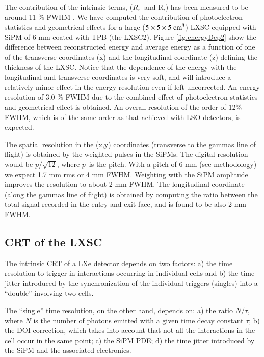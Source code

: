 \documentclass[review]{elsarticle}
\begin{document}
The contribution of the intrinsic terms, ($R_r$~and R$_i$) has been measured to be
around 11 \% FWHM \cite{aprileRes}. We have computed the contribution of photoelectron statistics and geometrical effects for a large
($5 \times 5 \times 5 {\rm ~cm^3}$) LXSC equipped with SiPM of 6 mm coated with TPB (the LXSC2).  
Figure \ref{fig.energyDep2} show the difference between reconstructed energy and average energy as a function of one of the transverse coordinates (x) and the longitudinal coordinate (z) defining the thickness of the LXSC. Notice that the dependence of the energy with the longitudinal and transverse coordinates is very soft, and will introduce a relatively minor effect in the energy resolution even if left uncorrected. An energy resolution of 3.0 \% FWHM due to the combined effect of photoelectron statistics and geometrical effect is obtained. 
An overall resolution of the order of 12\% FWHM, which is of the same order as that achieved with LSO detectors, is expected. 

The spatial resolution in the (x,y) coordinates (transverse to the gammas line of flight) is obtained by the weighted pulses in the SiPMs. The digital resolution would be
$p/\sqrt{12}$, where $p$~is the pitch. With a pitch of 6 mm (see methodology) we expect 1.7 mm rms or 4 mm FWHM. Weighting with the SiPM amplitude improves the resolution to about 2 mm FWHM. The longitudinal coordinate (along the gammas line of flight) is obtained by computing the ratio between the
total signal recorded in the entry and exit face, and is found to be also 2 mm FWHM. 


\subsection*{CRT  of the LXSC}

The intrinsic CRT of a LXe detector depends on two factors: a) the time resolution to trigger in interactions occurring in individual cells and b) the time jitter introduced by the synchronization of the individual triggers (singles) into a ``double'' involving two cells. 

The ``single'' time resolution, on the other hand, depends on: a) the ratio $N/\tau$, where $N$ is the number of photons emitted with a given time decay constant $\tau$; b) the DOI correction, which takes into account that not all the interactions in the cell occur in the same point; c) the SiPM PDE; d) the time jitter introduced by the SiPM and the associated electronics. 
\end{document}
